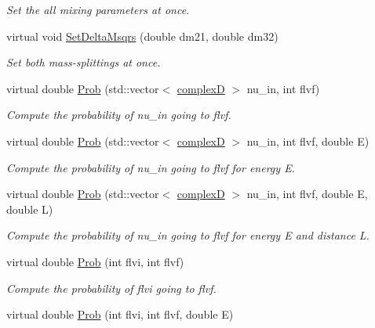 \begin{DoxyCompactItemize}
\begin{DoxyCompactList}\small\item\em Set the all mixing parameters at once. \end{DoxyCompactList}\item 
virtual void \hyperlink{classOscProb_1_1PMNS__Fast_a63733b246e6d2e609ce3de7a65ba5b9f}{Set\+Delta\+Msqrs} (double dm21, double dm32)
\begin{DoxyCompactList}\small\item\em Set both mass-\/splittings at once. \end{DoxyCompactList}\item 
virtual double \hyperlink{classOscProb_1_1PMNS__Base_a63f6450914b2ef712fbdc45787d9a27f}{Prob} (std\+::vector$<$ \hyperlink{EigenPoint_8h_a67ca8e107e20610c3fff78d5e726ece0}{complexD} $>$ nu\+\_\+in, int flvf)
\begin{DoxyCompactList}\small\item\em Compute the probability of nu\+\_\+in going to flvf. \end{DoxyCompactList}\item 
virtual double \hyperlink{classOscProb_1_1PMNS__Base_ad850329a991146c82857fb31c00658f7}{Prob} (std\+::vector$<$ \hyperlink{EigenPoint_8h_a67ca8e107e20610c3fff78d5e726ece0}{complexD} $>$ nu\+\_\+in, int flvf, double E)
\begin{DoxyCompactList}\small\item\em Compute the probability of nu\+\_\+in going to flvf for energy E. \end{DoxyCompactList}\item 
virtual double \hyperlink{classOscProb_1_1PMNS__Base_a596c89c681142e72e70844268a9a765b}{Prob} (std\+::vector$<$ \hyperlink{EigenPoint_8h_a67ca8e107e20610c3fff78d5e726ece0}{complexD} $>$ nu\+\_\+in, int flvf, double E, double L)
\begin{DoxyCompactList}\small\item\em Compute the probability of nu\+\_\+in going to flvf for energy E and distance L. \end{DoxyCompactList}\item 
virtual double \hyperlink{classOscProb_1_1PMNS__Base_aec5c399b93261f1962a4b7dbbb44b973}{Prob} (int flvi, int flvf)
\begin{DoxyCompactList}\small\item\em Compute the probability of flvi going to flvf. \end{DoxyCompactList}\item 
virtual double \hyperlink{classOscProb_1_1PMNS__Base_aa3cee10639d5c0879ccb9e78d62128d3}{Prob} (int flvi, int flvf, double E)

\end{DoxyCompactItemize}
